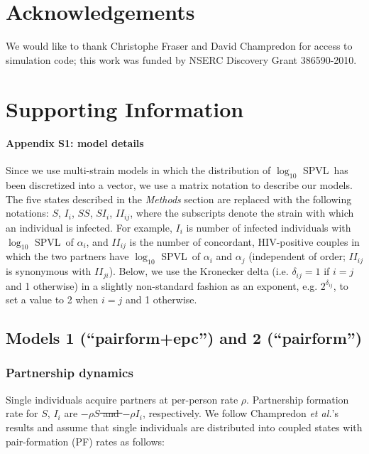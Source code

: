\documentclass[10pt,letterpaper]{article}
\newcommand{\Lspvl}{$\log_{10}$ SPVL}
\newcommand{\etal}{\textit{et al.}}
\providecommand{\DIFaddtex}[1]{{\protect\color{blue}\uwave{#1}}} %
\providecommand{\DIFdeltex}[1]{{\protect\color{red}\sout{#1}}}                      %
\providecommand{\DIFaddbegin}{} %
\providecommand{\DIFaddend}{} %
\providecommand{\DIFdelbegin}{} %
\providecommand{\DIFdelend}{} %
\providecommand{\DIFadd}[1]{\texorpdfstring{\DIFaddtex{#1}}{#1}} %
\providecommand{\DIFdel}[1]{\texorpdfstring{\DIFdeltex{#1}}{}} %
\newcommand{\DIFscaledelfig}{0.5}
\newlength{\DIFdelgraphicswidth} %
\newlength{\DIFdelgraphicsheight} %
\newcommand{\DIFaddincludegraphics}[2][]{{\color{blue}\fbox{\DIFOincludegraphics[#1]{#2}}}} %
\newcommand{\DIFdelincludegraphics}[2][]{%
\sbox{\DIFdelgraphicsbox}{\DIFOincludegraphics[#1]{#2}}%
\settoboxwidth{\DIFdelgraphicswidth}{\DIFdelgraphicsbox} %
\settoboxtotalheight{\DIFdelgraphicsheight}{\DIFdelgraphicsbox} %
\scalebox{\DIFscaledelfig}{%
\parbox[b]{\DIFdelgraphicswidth}{\usebox{\DIFdelgraphicsbox}\\[-\baselineskip] \rule{\DIFdelgraphicswidth}{0em}}\llap{\resizebox{\DIFdelgraphicswidth}{\DIFdelgraphicsheight}{%
\setlength{\unitlength}{\DIFdelgraphicswidth}%
\begin{picture}(1,1)%
\thicklines\linethickness{2pt} %
{\color[rgb]{1,0,0}\put(0,0){\framebox(1,1){}}}%
{\color[rgb]{1,0,0}\put(0,0){\line( 1,1){1}}}%
{\color[rgb]{1,0,0}\put(0,1){\line(1,-1){1}}}%
\end{picture}%
}\hspace*{3pt}}} %
} %
\DeclareRobustCommand{\DIFaddbegin}{\DIFOaddbegin \let\includegraphics\DIFaddincludegraphics} %
\DeclareRobustCommand{\DIFaddend}{\DIFOaddend \let\includegraphics\DIFOincludegraphics} %
\DeclareRobustCommand{\DIFdelbegin}{\DIFOdelbegin \let\includegraphics\DIFdelincludegraphics} %
\DeclareRobustCommand{\DIFdelend}{\DIFOaddend \let\includegraphics\DIFOincludegraphics} %
\begin{document}
\section*{Acknowledgements}
We would like to thank Christophe Fraser and
David Champredon for access to simulation code;
this work was funded by NSERC Discovery Grant 386590-2010.


\section*{Supporting Information}

\paragraph*{Appendix S1: model details}
\label{S1_Appendix}

Since we use multi-strain models in which the distribution of \Lspvl\ has been discretized into a vector, we use a matrix notation to describe our models. The five states described in the \emph{Methods} section are replaced with the following notations: $S$, $I_i$, $SS$, $SI_i$, $II_{ij}$, where the subscripts denote the strain with which an individual is infected. For example, $I_i$ is number of infected individuals with \Lspvl\ of $\alpha_i$, and $II_{ij}$ is the number of concordant, HIV-positive couples in which the two partners have \Lspvl\ of $\alpha_i$ and $\alpha_j$ (independent of order; $II_{ij}$ is synonymous with $II_{ji}$). 
Below, we use the Kronecker delta (i.e. $\delta_{ij}=1$ if $i=j$ and 1 otherwise) in a slightly non-standard fashion as an exponent, e.g. $2^{\delta_{ij}}$, to set a value to 2 when $i=j$ and 1 otherwise.

\subsection*{Models 1 (``pairform+epc'') and 2 (``pairform'')}

\subsubsection*{Partnership dynamics}

Single individuals acquire partners at per-person rate $\rho$. Partnership formation rate for $S$, $I_i$ are \DIFdelbegin \DIFdel{$- \rho S$ and $-\rho I_i$}\DIFdelend \DIFaddbegin \DIFadd{$\rho S$ and $\rho I_i$}\DIFaddend , respectively. We follow Champredon \etal's results \DIFaddbegin \DIFadd{\mbox{%
\cite{champredon_hiv_2013} }%
}\DIFaddend and assume that single individuals are distributed into coupled states with pair-formation (PF) rates as follows:
\end{document}
